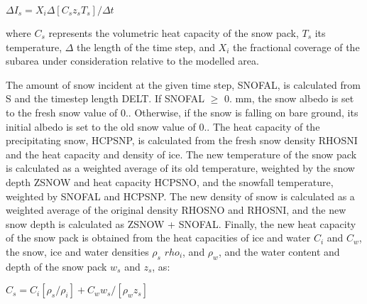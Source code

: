 $\Delta I_s = X_i \Delta [C_s z_s T_s] / \Delta t$

where $C_s$ represents the volumetric heat capacity of the snow pack, $T_s$ its temperature, $\Delta$ the length of the time step, and $X_i$ the fractional coverage of the subarea under consideration relative to the modelled area.

The amount of snow incident at the given time step, S\+N\+O\+F\+A\+L, is calculated from S and the timestep length D\+E\+L\+T. If S\+N\+O\+F\+A\+L $\geq$ 0. mm, the snow albedo is set to the fresh snow value of 0.. Otherwise, if the snow is falling on bare ground, its initial albedo is set to the old snow value of 0.. The heat capacity of the precipitating snow, H\+C\+P\+S\+N\+P, is calculated from the fresh snow density R\+H\+O\+S\+N\+I and the heat capacity and density of ice. The new temperature of the snow pack is calculated as a weighted average of its old temperature, weighted by the snow depth Z\+S\+N\+O\+W and heat capacity H\+C\+P\+S\+N\+O, and the snowfall temperature, weighted by S\+N\+O\+F\+A\+L and H\+C\+P\+S\+N\+P. The new density of snow is calculated as a weighted average of the original density R\+H\+O\+S\+N\+O and R\+H\+O\+S\+N\+I, and the new snow depth is calculated as Z\+S\+N\+O\+W + S\+N\+O\+F\+A\+L. Finally, the new heat capacity of the snow pack is obtained from the heat capacities of ice and water $C_i$ and $C_w$, the snow, ice and water densities $\rho_s$ $rho_i$, and $\rho_w$, and the water content and depth of the snow pack $w_s$ and $z_s$, as\+:

$C_s = C_i [ \rho_s /\rho_i ] + C_w w_s /[\rho_w z_s]$